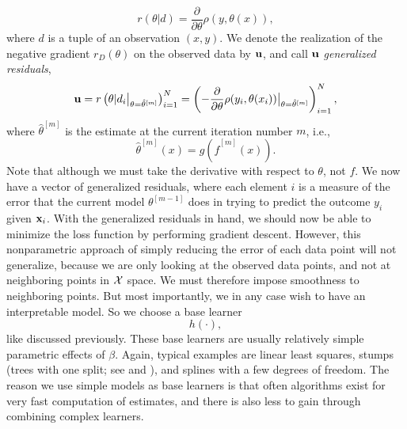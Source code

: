\begin{equation}
    r(\theta|d)=\frac{\partial}{\partial\theta} \rho(y,\theta(x)),
\end{equation}
where $d$ is a tuple of an observation $(x,y)$. We denote the realization of the negative gradient $r_D(\theta)$ on the observed data by $\mathbf{u}$, and call $\mathbf{u}$ \textit{generalized residuals},
\begin{equation}
    \mathbf{u}=r\left(\theta|d_i\big\rvert_{\theta=\hat{\theta}^{[m]}}\right)_{i=1}^N=\left(-\frac{\partial}{\partial \theta}\rho(y_i, \theta(x_i))\big\rvert_{\theta=\hat{\theta}^{[m]}}\right)_{i=1}^N,
\end{equation}
where $\hat{\theta}^{[m]}$ is the estimate at the current iteration number $m$, i.e.,
\begin{equation}
    \hat{\theta}^{[m]}(x)=g(\hat{f}^{[m]}(x)).
\end{equation}
Note that although we must take the derivative with respect to $\theta$, not $f$.
We now have a vector of generalized residuals, where each element $i$ is a measure of the error that the current model $\theta^{[m-1]}$
does in trying to predict the outcome $y_i$ given $\mathbf{x}_i$.
With the generalized residuals in hand, we should now be able to minimize the loss function by performing gradient descent. However, this nonparametric approach of simply reducing the error of each data point will not generalize, because we are only looking at the observed data points, and not at neighboring points in $\mathcal{X}$ space. We must therefore impose smoothness to neighboring points. But most importantly, we in any case wish to have an interpretable model. So we choose a base learner
\begin{equation}
    h(\cdot),
\end{equation}
like discussed previously. These base learners are usually relatively simple parametric effects of $\beta$. Again, typical examples are linear least squares, stumps (trees with one split; see \citet{buhlmann2007} and \citet{ESL}), and splines with a few degrees of freedom. The reason we use simple models as base learners is that often algorithms exist for very fast computation of estimates, and there is also less to gain through combining complex learners.

